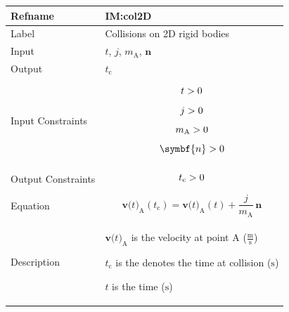 \documentclass[12pt]{article}
\newcommand{\gt}{\ensuremath >}
\begin{document}
\begin{minipage}{\textwidth}
\begin{tabular}{>{\raggedright}p{}>{\raggedright\arraybackslash}p{}}
\toprule \textbf{Refname} & \textbf{IM:col2D}
\label{IM:col2D}
\\ \midrule
Label & Collisions on 2D rigid bodies
        
\\ \midrule
Input & $t$, $j$, ${m_{\text{A}}}$, $\symbf{n}$
        
\\ \midrule
Output & ${t_{\text{c}}}$
         
\\ \midrule
Input Constraints & \begin{displaymath}
                    t\gt{}0
                    \end{displaymath}
                    \begin{displaymath}
                    j\gt{}0
                    \end{displaymath}
                    \begin{displaymath}
                    {m_{\text{A}}}\gt{}0
                    \end{displaymath}
                    \begin{displaymath}
                    \symbf{n}\gt{}0
                    \end{displaymath}
\\ \midrule
Output Constraints & \begin{displaymath}
                     {t_{\text{c}}}\gt{}0
                     \end{displaymath}
\\ \midrule
Equation & \begin{displaymath}
           {\symbf{v}\text{(}t\text{)}_{\text{A}}}\left({t_{\text{c}}}\right)={\symbf{v}\text{(}t\text{)}_{\text{A}}}\left(t\right)+\frac{j}{{m_{\text{A}}}}\,\symbf{n}
           \end{displaymath}
\\ \midrule
Description & \begin{symbDescription}
              \item{${\symbf{v}\text{(}t\text{)}_{\text{A}}}$ is the velocity at point A ($\frac{\text{m}}{\text{s}}$)}
              \item{${t_{\text{c}}}$ is the denotes the time at collision (${\text{s}}$)}
              \item{$t$ is the time (${\text{s}}$)}

\end{symbDescription}
\end{tabular}
\end{minipage}
\end{document}
